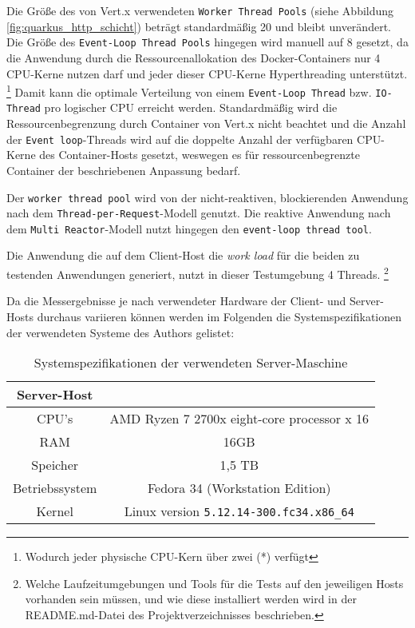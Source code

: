 Die Größe des von Vert.x verwendeten \verb|Worker Thread Pools| (siehe Abbildung \ref{fig:quarkus_http_schicht}) beträgt standardmäßig 20 und bleibt
unverändert. Die Größe des \verb|Event-Loop Thread Pools| hingegen wird manuell auf 8 gesetzt, da die Anwendung durch die Ressourcenallokation
des Docker-Containers nur 4 CPU-Kerne nutzen darf und jeder dieser CPU-Kerne Hyperthreading unterstützt. \footnote{Wodurch jeder physische CPU-Kern über
  zwei (*) verfügt}
Damit kann die optimale Verteilung von einem \verb|Event-Loop Thread| bzw. \verb|IO-Thread| pro logischer CPU erreicht werden.
Standardmäßig wird die Ressourcenbegrenzung durch Container von Vert.x nicht beachtet und die Anzahl der \verb|Event loop|-Threads wird auf die doppelte
Anzahl der verfügbaren CPU-Kerne des Container-Hosts gesetzt, weswegen es für ressourcenbegrenzte Container der beschriebenen Anpassung bedarf.

Der \verb|worker thread pool| wird von der nicht-reaktiven, blockierenden Anwendung nach dem \verb|Thread-per-Request|-Modell genutzt.
Die reaktive Anwendung nach dem \verb|Multi Reactor|-Modell nutzt hingegen den \verb|event-loop thread tool|.

Die Anwendung die auf dem Client-Host die \textit{work load} für die beiden zu testenden Anwendungen generiert,
nutzt in dieser Testumgebung 4 Threads.
\footnote{Welche Laufzeitumgebungen und Tools für die Tests auf den jeweiligen Hosts vorhanden sein müssen, und wie diese installiert werden
  wird in der README.md-Datei des Projektverzeichnisses beschrieben.}

Da die Messergebnisse je nach verwendeter Hardware der Client- und Server-Hosts durchaus variieren können werden im Folgenden
die Systemspezifikationen der verwendeten Systeme des Authors gelistet:
\begin{table}[ht!]
  \centering
  \begin{tabular}{| c | c |}
    \hline
    Server-Host                                                  \\
    \hline
    CPU's          & AMD Ryzen 7 2700x eight-core processor x 16 \\
    \hline
    RAM            & 16GB                                        \\
    \hline
    Speicher       & 1,5 TB                                      \\
    \hline
    Betriebssystem & Fedora 34 (Workstation Edition)             \\
    \hline
    Kernel         & Linux version \verb|5.12.14-300.fc34.x86_64|   \\
    \hline
  \end{tabular}
  \caption{Systemspezifikationen der verwendeten Server-Maschine}
  \label{table:system_host}
\end{table}

